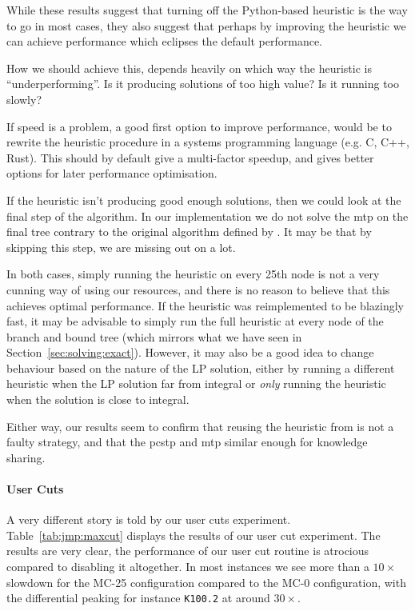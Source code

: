 While these results suggest that turning off the Python-based heuristic is the way to go
in most cases,
they also suggest that perhaps by improving the heuristic we can achieve performance
which eclipses the default performance.

How we should achieve this, depends heavily on which way the heuristic is ``underperforming''.
 Is it producing solutions of too high value? Is it running too slowly?

 If speed is a problem, a good first option to improve performance,
 would be to rewrite the heuristic procedure
in a systems programming language (e.g. C, C++, Rust).
This should by default give a multi-factor speedup, and gives better options for
later performance optimisation.

If the heuristic isn't producing good enough solutions, then we could look at the final step
of the algorithm. In our implementation we do not solve the \gls{mtp} on the final tree contrary
to the original algorithm defined by \citet{ljubic2005solving}. It may be that by skipping
this step, we are missing out on a lot.

In both cases, simply running the heuristic on every 25th node is not a very cunning
way of using our resources, and there is no reason to believe that this achieves optimal
performance. If the heuristic was reimplemented to be blazingly fast, it may be advisable to
simply run the full heuristic at every node of the branch and bound tree
(which mirrors what we have seen in Section~\ref{sec:solving:exact}). However, it may also
be a good idea to change behaviour based on the nature of the LP solution, either by
running a different heuristic when the LP solution far from integral or \textit{only}
running the heuristic when the solution is close to integral. 

Either way, our results seem to confirm that reusing the heuristic from
\citeauthor{ljubic2005solving} is not a faulty strategy, and that the \gls{pcstp}
and \gls{mtp} similar enough for knowledge sharing.

\paragraph{User Cuts}
A very different story is told by our user cuts experiment. Table~\ref{tab:jmp:maxcut}
displays the results of our user cut experiment. The results are very clear, the performance
of our user cut routine is atrocious compared to disabling it altogether. In most instances
we see more than a $10 \times$ slowdown for the MC-25 configuration compared to the MC-0
configuration, with the differential peaking for instance \texttt{K100.2} at around $30 \times$.

